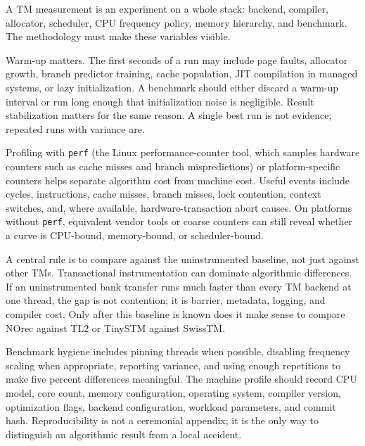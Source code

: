 A TM measurement is an experiment on a whole stack: backend, compiler, allocator, scheduler, CPU frequency policy, memory hierarchy, and benchmark. The methodology must make these variables visible.

Warm-up matters. The first seconds of a run may include page faults, allocator growth, branch predictor training, cache population, JIT compilation in managed systems, or lazy initialization. A benchmark should either discard a warm-up interval or run long enough that initialization noise is negligible. Result stabilization matters for the same reason. A single best run is not evidence; repeated runs with variance are.

Profiling with \texttt{perf} (the Linux performance-counter tool, which samples hardware counters such as cache misses and branch mispredictions) or platform-specific counters helps separate algorithm cost from machine cost. Useful events include cycles, instructions, cache misses, branch misses, lock contention, context switches, and, where available, hardware-transaction abort causes. On platforms without \texttt{perf}, equivalent vendor tools or coarse counters can still reveal whether a curve is CPU-bound, memory-bound, or scheduler-bound.

A central rule is to compare against the uninstrumented baseline, not just against other TMs. Transactional instrumentation can dominate algorithmic differences. If an uninstrumented bank transfer runs much faster than every TM backend at one thread, the gap is not contention; it is barrier, metadata, logging, and compiler cost. Only after this baseline is known does it make sense to compare NOrec against TL2 or TinySTM against SwissTM.

Benchmark hygiene includes pinning threads when possible, disabling frequency scaling when appropriate, reporting variance, and using enough repetitions to make five percent differences meaningful. The machine profile should record CPU model, core count, memory configuration, operating system, compiler version, optimization flags, backend configuration, workload parameters, and commit hash. Reproducibility is not a ceremonial appendix; it is the only way to distinguish an algorithmic result from a local accident.

